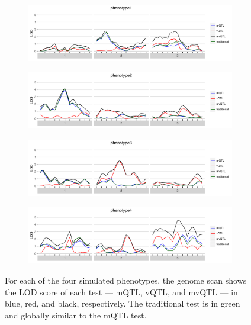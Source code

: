 \documentclass[9pt,twocolumn,twoside]{gsag3jnl}
\begin{document}
\begin{figure}[t]
    \begin{subfigure}[b]{\linewidth}
        \includegraphics[width=\textwidth]{images/LOD_scan_phenotype1.pdf}
    \end{subfigure}
    \begin{subfigure}[b]{\linewidth}
        \includegraphics[width=\textwidth]{images/LOD_scan_phenotype2.pdf}
    \end{subfigure}
    \begin{subfigure}[b]{\linewidth}
        \includegraphics[width=\textwidth]{images/LOD_scan_phenotype3.pdf}
    \end{subfigure}
    \begin{subfigure}[b]{\linewidth}
        \includegraphics[width=\textwidth]{images/LOD_scan_phenotype4.pdf}
    \end{subfigure}
    \caption{
        For each of the four simulated phenotypes, the genome scan shows the LOD score of each test --- mQTL, vQTL, and mvQTL --- in blue, red, and black, respectively.
        The traditional test is in green and globally similar to the mQTL test.
    }
    \label{fig:lod_score_scans}
\end{figure}
\end{document}
